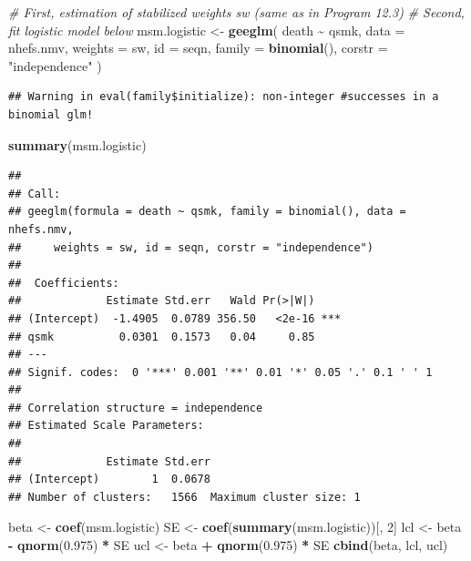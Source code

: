 \documentclass[
  10pt,
]{book}
\newenvironment{Shaded}{\begin{snugshade}}{\end{snugshade}}
\newcommand{\CommentTok}[1]{\textcolor[rgb]{0.56,0.35,0.01}{\textit{#1}}}
\newcommand{\DataTypeTok}[1]{\textcolor[rgb]{0.13,0.29,0.53}{#1}}
\newcommand{\DecValTok}[1]{\textcolor[rgb]{0.00,0.00,0.81}{#1}}
\newcommand{\FloatTok}[1]{\textcolor[rgb]{0.00,0.00,0.81}{#1}}
\newcommand{\KeywordTok}[1]{\textcolor[rgb]{0.13,0.29,0.53}{\textbf{#1}}}
\newcommand{\NormalTok}[1]{#1}
\newcommand{\OperatorTok}[1]{\textcolor[rgb]{0.81,0.36,0.00}{\textbf{#1}}}
\newcommand{\StringTok}[1]{\textcolor[rgb]{0.31,0.60,0.02}{#1}}
\begin{document}
\begin{Shaded}
\begin{Highlighting}[]
\CommentTok{\# First, estimation of stabilized weights sw (same as in Program 12.3)}
\CommentTok{\# Second, fit logistic model below}
\NormalTok{msm.logistic \textless{}{-}}\StringTok{ }\KeywordTok{geeglm}\NormalTok{(}
\NormalTok{  death }\OperatorTok{\textasciitilde{}}\StringTok{ }\NormalTok{qsmk,}
  \DataTypeTok{data =}\NormalTok{ nhefs.nmv,}
  \DataTypeTok{weights =}\NormalTok{ sw,}
  \DataTypeTok{id =}\NormalTok{ seqn,}
  \DataTypeTok{family =} \KeywordTok{binomial}\NormalTok{(),}
  \DataTypeTok{corstr =} \StringTok{"independence"}
\NormalTok{)}
\end{Highlighting}
\end{Shaded}

\begin{verbatim}
## Warning in eval(family$initialize): non-integer #successes in a binomial glm!
\end{verbatim}

\begin{Shaded}
\begin{Highlighting}[]
\KeywordTok{summary}\NormalTok{(msm.logistic)}
\end{Highlighting}
\end{Shaded}

\begin{verbatim}
## 
## Call:
## geeglm(formula = death ~ qsmk, family = binomial(), data = nhefs.nmv, 
##     weights = sw, id = seqn, corstr = "independence")
## 
##  Coefficients:
##             Estimate Std.err   Wald Pr(>|W|)    
## (Intercept)  -1.4905  0.0789 356.50   <2e-16 ***
## qsmk          0.0301  0.1573   0.04     0.85    
## ---
## Signif. codes:  0 '***' 0.001 '**' 0.01 '*' 0.05 '.' 0.1 ' ' 1
## 
## Correlation structure = independence 
## Estimated Scale Parameters:
## 
##             Estimate Std.err
## (Intercept)        1  0.0678
## Number of clusters:   1566  Maximum cluster size: 1
\end{verbatim}

\begin{Shaded}
\begin{Highlighting}[]
\NormalTok{beta \textless{}{-}}\StringTok{ }\KeywordTok{coef}\NormalTok{(msm.logistic)}
\NormalTok{SE \textless{}{-}}\StringTok{ }\KeywordTok{coef}\NormalTok{(}\KeywordTok{summary}\NormalTok{(msm.logistic))[, }\DecValTok{2}\NormalTok{]}
\NormalTok{lcl \textless{}{-}}\StringTok{ }\NormalTok{beta }\OperatorTok{{-}}\StringTok{ }\KeywordTok{qnorm}\NormalTok{(}\FloatTok{0.975}\NormalTok{) }\OperatorTok{*}\StringTok{ }\NormalTok{SE}
\NormalTok{ucl \textless{}{-}}\StringTok{ }\NormalTok{beta }\OperatorTok{+}\StringTok{ }\KeywordTok{qnorm}\NormalTok{(}\FloatTok{0.975}\NormalTok{) }\OperatorTok{*}\StringTok{ }\NormalTok{SE}
\KeywordTok{cbind}\NormalTok{(beta, lcl, ucl)}
\end{Highlighting}
\end{Shaded}
\end{document}
